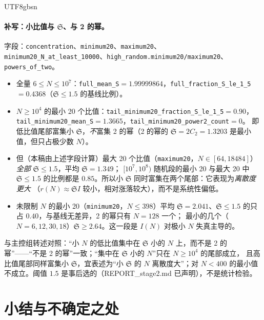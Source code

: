 \documentclass[11pt,a4paper]{article}
\newcommand{\Sing}{\mathfrak S}
\theoremstyle{plain}
\theoremstyle{definition}
\begin{document}
\begin{CJK}{UTF8}{gbsn}
\paragraph{补写：小比值与 $\Sing$、与 2 的幂。}
字段：\texttt{concentration}、\texttt{minimum20}、\texttt{maximum20}、\texttt{minimum20\_N\_at\_least\_10000}、\texttt{high\_random.minimum20/maximum20}、\texttt{powers\_of\_two}。
\begin{itemize}[leftmargin=*]
\item 全量 $6\le N\le10^7$：\texttt{full\_mean\_S}$=1.99999864$，\texttt{full\_fraction\_S\_le\_1\_5}$=0.4368$（$\Sing\le1.5$ 的基线比例）。
\item $N\ge10^4$ 的最小 20 个比值：\texttt{tail\_minimum20\_fraction\_S\_le\_1\_5}$=0.90$，\texttt{tail\_minimum20\_mean\_S}$=1.3665$，\texttt{tail\_minimum20\_power2\_count}$=0$。
即低比值尾部富集小 $\Sing$，\emph{不}富集 2 的幂（2 的幂的 $\Sing=2C_2=1.3203$ 是最小值，但只占极少数 $N$）。
\item 但（本稿由上述字段计算）最大 20 个比值（\texttt{maximum20}，$N\in[64,18484]$）\emph{全部} $\Sing\le1.5$，平均 $\Sing=1.349$；
$[10^7,10^8)$ 随机段的最小 20 与最大 20 中 $\Sing\le1.5$ 的比例都是 $0.85$。所以小 $\Sing$ 同时富集在两个尾部：它表现为\emph{离散度更大}
（$r(N)\approx\Sing I$ 较小，相对涨落较大），而不是系统性偏低。
\item 未限制 $N$ 的最小 20（\texttt{minimum20}，$N\le398$）平均 $\Sing=2.041$、$\Sing\le1.5$ 的只占 $0.40$，与基线无差异，2 的幂只有 $N=128$ 一个；
最小的几个（$N=6,12,30,18$）$\Sing\ge2.64$。这一段是 $I(N)$ 对极小 $N$ 失真主导的。
\end{itemize}
与主控组转述对照：“小 $N$ 的低比值集中在 $\Sing$ 小的 $N$ 上，而不是 2 的幂”——“不是 2 的幂”一致；“集中在 $\Sing$ 小的 $N$”只在 $N\ge10^4$ 的尾部成立，
且高比值尾部同样富集小 $\Sing$，宜表述为“小 $\Sing$ 的 $N$ 离散度大”；对 $N<400$ 的最小值不成立。阈值 $1.5$ 是事后选的（REPORT\_stage2.md 已声明），不是统计检验。

\section{小结与不确定之处}\label{sec:summary}


\end{CJK}
\end{document}
